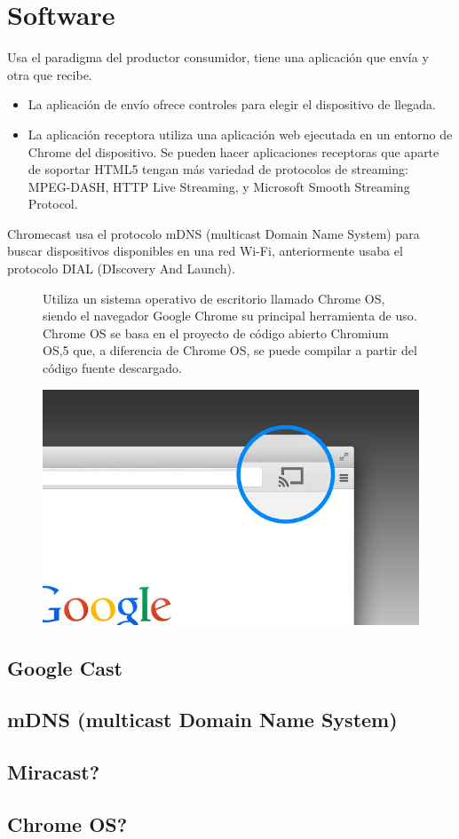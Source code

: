 \section{Software}
Usa el paradigma del productor consumidor, tiene una aplicación que envía y otra que recibe.
\begin{itemize}	
	\item La aplicación de envío ofrece controles para elegir el dispositivo de llegada.
	\item La aplicación receptora utiliza una aplicación web ejecutada en un entorno de Chrome del dispositivo. Se pueden hacer aplicaciones receptoras que aparte de soportar HTML5 tengan más variedad de protocolos de streaming: MPEG-DASH, HTTP Live Streaming, y Microsoft Smooth Streaming Protocol.
\end{itemize}

Chromecast usa el protocolo mDNS (multicast Domain Name System) para buscar dispositivos disponibles en una red Wi-Fi, anteriormente usaba el protocolo DIAL (DIscovery And Launch).




\begin{figure}[ht] 
	\begin{minipage}[b]{0.55\linewidth}
	Utiliza un sistema operativo de escritorio llamado Chrome OS, siendo el navegador Google Chrome su principal herramienta de uso.  
	Chrome OS se basa en el proyecto de código abierto Chromium OS,5 que, a diferencia de Chrome OS, se puede compilar a partir del código fuente descargado.
	\end{minipage}%
	\begin{minipage}[b]{0.45\linewidth}
		\centering
		\includegraphics[width=.65\linewidth]{./Imagenes/googlecastbrowser.jpg} 
	\end{minipage} 
\end{figure}

\subsection{Google Cast}
\subsection{mDNS (multicast Domain Name System)}
\subsection{Miracast?}

\subsection{Chrome OS?}